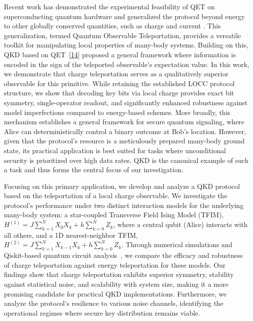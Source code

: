 Recent work has demonstrated the experimental feasibility of QET on superconducting quantum hardware \cite{Ikeda2023} and generalized the protocol beyond energy to other globally conserved quantities, such as charge and current \cite{IkedaTeleportingCharge}. This generalization, termed Quantum Observable Teleportation, provides a versatile toolkit for manipulating local properties of many-body systems. Building on this, QKD based on QET~\ref{14} proposed a general framework where information is encoded in the sign of the teleported observable's expectation value. In this work, we demonstrate that charge teleportation serves as a qualitatively superior observable for this primitive. While retaining the established LOCC protocol structure, we show that decoding key bits via local charge provides exact bit symmetry, single-operator readout, and significantly enhanced robustness against model imperfections compared to energy-based schemes. More broadly, this mechanism establishes a general framework for secure quantum signaling, where Alice can deterministically control a binary outcome at Bob's location. However, given that the protocol's resource is a meticulously prepared many-body ground state, its practical application is best suited for tasks where unconditional security is prioritized over high data rates. QKD is the canonical example of such a task and thus forms the central focus of our investigation.

Focusing on this primary application, we develop and analyze a QKD protocol based on the teleportation of a local charge observable. We investigate the protocol's performance under two distinct interaction models for the underlying many-body system: a star-coupled Transverse Field Ising Model (TFIM), $H^{(1)} = J\sum_{k=1}^{N}X_{0}X_{k}+h\sum_{k=0}^{N}Z_{k}$, where a central qubit (Alice) interacts with all others, and a 1D nearest-neighbor TFIM, $H^{(2)} = J\sum_{k=1}^{N}X_{k-1}X_{k}+h\sum_{k=0}^{N}Z_{k}$. Through numerical simulations and Qiskit-based quantum circuit analysis~\cite{Amir_QKD_by_Charge_Teleportation}, we compare the efficacy and robustness of charge teleportation against energy teleportation for these models. Our findings show that charge teleportation exhibits superior symmetry, stability against statistical noise, and scalability with system size, making it a more promising candidate for practical QKD implementations. Furthermore, we analyze the protocol's resilience to various noise channels, identifying the operational regimes where secure key distribution remains viable.

